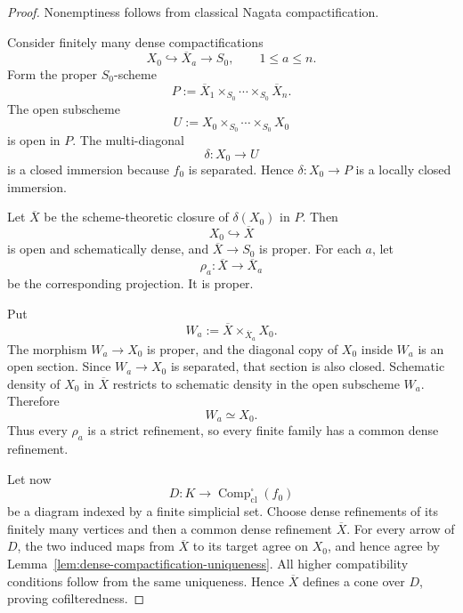 \begin{proof}
Nonemptiness follows from classical Nagata compactification.

Consider finitely many dense compactifications
\[
    X_0\hookrightarrow\overline X_a\longrightarrow S_0,
    \qquad
    1\leq a\leq n.
\]
Form the proper \(S_0\)-scheme
\[
    P
    :=
    \overline X_1
    \times_{S_0}
    \cdots
    \times_{S_0}
    \overline X_n.
\]
The open subscheme
\[
    U
    :=
    X_0
    \times_{S_0}
    \cdots
    \times_{S_0}
    X_0
\]
is open in \(P\).  The multi-diagonal
\[
    \delta:X_0\longrightarrow U
\]
is a closed immersion because \(f_0\) is separated.  Hence
\(\delta:X_0\to P\) is a locally closed immersion.

Let \(\overline X\) be the scheme-theoretic closure of \(\delta(X_0)\) in
\(P\).  Then
\[
    X_0\hookrightarrow\overline X
\]
is open and schematically dense, and \(\overline X\to S_0\) is proper.
For each \(a\), let
\[
    \rho_a:\overline X\longrightarrow\overline X_a
\]
be the corresponding projection.  It is proper.

Put
\[
    W_a
    :=
    \overline X\times_{\overline X_a}X_0.
\]
The morphism \(W_a\to X_0\) is proper, and the diagonal copy of \(X_0\)
inside \(W_a\) is an open section.  Since \(W_a\to X_0\) is separated,
that section is also closed.  Schematic density of \(X_0\) in
\(\overline X\) restricts to schematic density in the open subscheme
\(W_a\).  Therefore
\[
    W_a\simeq X_0.
\]
Thus every \(\rho_a\) is a strict refinement, so every finite family has a
common dense refinement.

Let now
\[
    D:K\longrightarrow
    \operatorname{Comp}^{\square}_{\mathrm{cl}}(f_0)
\]
be a diagram indexed by a finite simplicial set.  Choose dense refinements of
its finitely many vertices and then a common dense refinement
\(\overline X\).  For every arrow of \(D\), the two induced maps from
\(\overline X\) to its target agree on \(X_0\), and hence agree by
Lemma~\ref{lem:dense-compactification-uniqueness}.  All higher compatibility
conditions follow from the same uniqueness.  Hence \(\overline X\) defines a
cone over \(D\), proving cofilteredness.
\end{proof}

